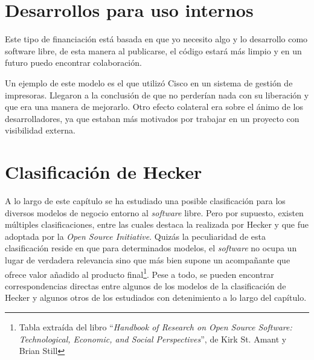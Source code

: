 \section{Desarrollos para uso internos}
Este tipo de financiación está basada en que yo necesito algo y lo desarrollo como
software libre, de esta manera al publicarse, el código estará más limpio y en un
futuro puedo encontrar colaboración.

Un ejemplo de este modelo es el que utilizó Cisco en un sistema de
gestión de impresoras. Llegaron a la conclusión de que no perderían
nada con su liberación y que era una manera de mejorarlo. Otro efecto
colateral era sobre el ánimo de los desarrolladores, ya que estaban
más motivados por trabajar en un proyecto con visibilidad externa.


\section{Clasificación de Hecker}

A lo largo de este capítulo se ha estudiado una posible clasificación para los
diversos modelos de negocio entorno al \textit{software} libre. Pero por
supuesto, existen múltiples clasificaciones, entre las cuales destaca la
realizada por Hecker y que fue adoptada por la \textit{Open Source Initiative}.
Quizás la peculiaridad de esta clasificación reside en que para determinados
modelos, el \textit{software} no ocupa un lugar de verdadera relevancia sino que
más bien supone un acompañante que ofrece valor añadido al producto
final\footnote{Tabla extraída del libro ``\textit{Handbook of Research on Open
Source Software: Technological, Economic, and Social Perspectives}'', de Kirk
St. Amant y Brian Still}. Pese a todo, se pueden encontrar correspondencias
directas entre algunos de los modelos de la clasificación de Hecker y
algunos otros de los estudiados con detenimiento a lo largo del capítulo.

\begin{figure}[htb]
  \centerline{}
  \label{IMG:Hecker}
\end{figure}
